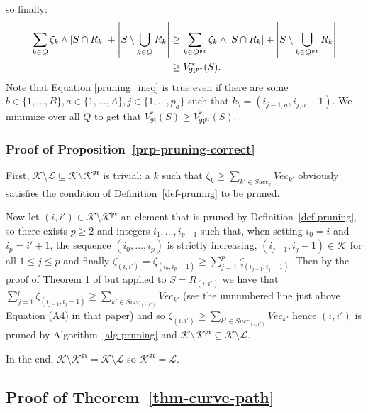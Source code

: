 \documentclass[
  11pt,
  a4paper,
]{article}
\theoremstyle{definition}
\theoremstyle{plain}
\theoremstyle{plain}
\theoremstyle{plain}
\theoremstyle{definition}
\theoremstyle{remark}
\begin{document}
so finally: \begin{align}
\sum_{k\in Q}\zeta_k\wedge|S\cap R_k|+\left| S\setminus\bigcup_{k\in Q} R_k   \right| &\geq \sum_{k\in Q^{\mathfrak{pr}}}\zeta_k\wedge|S\cap R_k|+\left| S\setminus\bigcup_{k\in Q^{\mathfrak{pr}}} R_k   \right|   \label{pruning_ineq}\\
&\geq V^*_{\mathfrak{R}^{\mathfrak{pr}}}(S). \notag
\end{align} Note that Equation \eqref{pruning_ineq} is true even if
there are some
\(b\in\{ 1,\dotsc,B\}, a\in\{ 1,\dotsc,A\}, j\in\{ 1,\dotsc,p_a\}\) such
that \(k_b=(i_{j-1,a}, i_{j,a}-1)\). We minimize over all \(Q\) to get
that
\(V^*_{\mathfrak{R}}(S)\geq V^*_{\mathfrak{R}^{\mathfrak{pr}}}(S)\).

\subsubsection{\texorpdfstring{Proof of
Proposition~\ref{prp-pruning-correct}}{Proof of Proposition~}}\label{sec-pruning-proofs-pruning-correct}

First,
\(\mathcal{K}\setminus\mathcal{L}\subseteq\mathcal{K}\setminus\mathcal{K}^{\mathfrak{pr}}\)
is trivial: a \(k\) such that
\(\zeta_{k} \geq  \sum_{k'\in Succ_k} Vec_{k'}\) obviously satisfies the
condition of Definition~\ref{def-pruning} to be pruned.

Now let \((i,i')\in \mathcal{K}\setminus\mathcal{K}^{\mathfrak{pr}}\) an
element that is pruned by Definition~\ref{def-pruning}, so there exists
\(p\geq2\) and integers \(i_1,\dotsc,i_{p-1}\) such that, when setting
\(i_0=i\) and \(i_{p}=i'+1\), the sequence \((i_0,\dotsc,i_{p})\) is
strictly increasing, \((i_{j-1},i_{j}-1)\in\mathcal{K}\) for all
\(1\leq j\leq p\) and finally
\(\zeta_{(i,i')}=\zeta_{(i_0,i_{p}-1)}\geq \sum_{j=1}^{p} \zeta_{(i_{j-1}, i_{j}-1)}\).
Then by the proof of Theorem 1 of \citet{MR4178188} but applied to
\(S=R_{(i,i')}\) we have that
\(\sum_{j=1}^{p} \zeta_{(i_{j-1}, i_{j}-1)}\geq  \sum_{k'\in Succ_{(i,i')}} Vec_{k'}\)
(see the unnumbered line just above Equation (A4) in that paper) and so
\(\zeta_{(i,i')}\geq \sum_{k'\in Succ_{(i,i')}} Vec_{k'}\) hence
\((i,i')\) is pruned by  Algorithm~\ref{alg-pruning}  and
\(\mathcal{K}\setminus\mathcal{K}^{\mathfrak{pr}}\subseteq\mathcal{K}\setminus\mathcal{L}\).

In the end,
\(\mathcal{K}\setminus\mathcal{K}^{\mathfrak{pr}}=\mathcal{K}\setminus\mathcal{L}\)
so \(\mathcal{K}^{\mathfrak{pr}}=\mathcal{L}\).

\subsection{\texorpdfstring{Proof of
Theorem~\ref{thm-curve-path}}{Proof of Theorem~}}\label{sec-proof}
\end{document}
